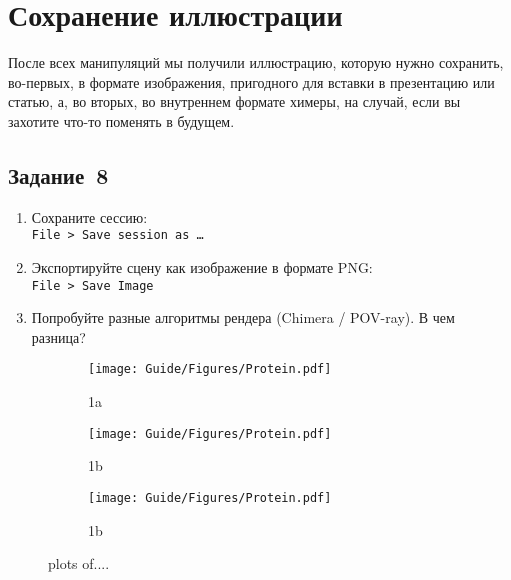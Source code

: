 \section{Сохранение иллюстрации}

После всех манипуляций мы получили иллюстрацию, которую нужно сохранить, во-первых, в формате изображения, пригодного для вставки в презентацию или статью, а, во вторых, во внутреннем формате химеры, на случай, если вы захотите что-то поменять в будущем.

\subsection*{Задание~8}
\begin{enumerate}
    \item Сохраните сессию:\\
    \texttt{File~> Save session as \dots}
    
    \item Экспортируйте сцену как изображение в формате PNG:\\
    \texttt{File~> Save Image}
    
    \item Попробуйте разные алгоритмы рендера (Chimera / POV-ray). В чем разница?
\end{enumerate}

\begin{figure}
\begin{subfigure}{.5\textwidth}
  \centering
  \texttt{[image: Guide/Figures/Protein.pdf]}
  \caption{1a}
  \label{fig:sfig1}
\end{subfigure}%
\begin{subfigure}{.5\textwidth}
  \centering
  \texttt{[image: Guide/Figures/Protein.pdf]}
  \caption{1b}
  \label{fig:sfig2}
\end{subfigure}
\begin{subfigure}{.5\textwidth}
  \centering
  \texttt{[image: Guide/Figures/Protein.pdf]}
  \caption{1b}
  \label{fig:sfig2}
\end{subfigure}
\caption{plots of....}
\label{fig:fig}
\end{figure}
